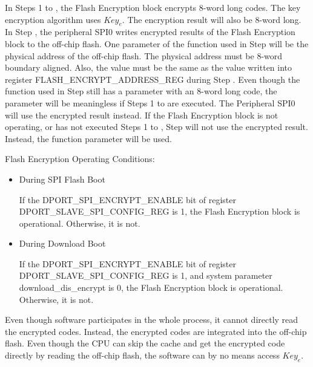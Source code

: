 \documentclass[main\_\_EN.tex]{subfiles}
\begin{document}
In Steps 1 to , the Flash Encryption block encrypts 8-word long codes. The key encryption algorithm uses \begin{math}Key_{e}\end{math}. The encryption result will also be 8-word long.
In Step , the peripheral SPI0 writes encrypted results of the Flash Encryption block to the off-chip flash. One parameter of the function used in Step  will be the physical address of the off-chip flash.
The physical address must be 8-word boundary aligned.
Also, the value must be the same as the value written into register FLASH\_ENCRYPT\_ADDRESS\_REG during Step .
Even though the function used in Step  still has a parameter with an 8-word long code, the parameter will be meaningless if Steps 1 to  are executed. The Peripheral SPI0 will use the encrypted result instead.
If the Flash Encryption block is not operating, or has not executed Steps 1 to , Step  will not use the encrypted result. Instead, the function parameter will be used.

Flash Encryption Operating Conditions:

\begin{itemize}

    \item During SPI Flash Boot

    If the DPORT\_SPI\_ENCRYPT\_ENABLE bit of register DPORT\_SLAVE\_SPI\_CONFIG\_REG is 1,
    the Flash Encryption block is operational. Otherwise, it is not.

    \item During Download Boot

    If the DPORT\_SPI\_ENCRYPT\_ENABLE bit of register DPORT\_SLAVE\_SPI\_CONFIG\_REG is 1, and system parameter download\_dis\_encrypt is 0,
    the Flash Encryption block is operational. Otherwise, it is not.

\end{itemize}

Even though software participates in the whole process, it cannot directly read the encrypted codes. Instead, the encrypted codes are integrated into the off-chip flash.
Even though the CPU can skip the cache and get the encrypted code directly by reading the off-chip flash, the software can by no means access \begin{math}Key_{e}\end{math}.
\end{document}
